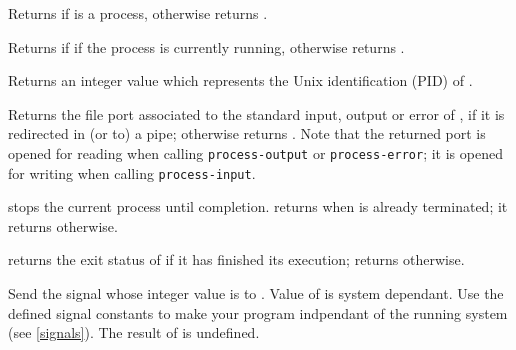 \begin{entry}{
}
\saut
Returns \schtrue{} if  is a process, otherwise returns
{\schfalse}.
\end{entry}

\begin{entry}{
}
\saut
Returns \schtrue{} if  if the process is currently running, 
otherwise returns {\schfalse}.
\end{entry}


\begin{entry}{
}
\saut
Returns an integer value which represents the Unix identification 
(PID) of .
\end{entry}

\begin{entry}{
}
\saut
Returns the file port associated to the standard input, output or error
of , if it is redirected in (or to) a pipe; otherwise
returns \schfalse. Note that the returned port is opened for reading
when calling {\tt process-output} or {\tt process-error}; it is opened
for writing when calling {\tt process-input}.
\end{entry}

\begin{entry}{
}
\saut
{} stops the current process until
 completion.  returns {\schfalse}
when  is already terminated; it returns {\schtrue} otherwise.
\end{entry}

\begin{entry}{
}
\saut
{} returns the exit status of  if
it has finished its execution; returns {\schfalse} otherwise.
\end{entry}

\begin{entry}{
}
\saut
Send the signal whose integer value is  to . Value
of  is system dependant. Use the defined signal constants to
make your program indpendant of the running system (see
\ref{signals}).  The result of  is undefined.
\end{entry}


